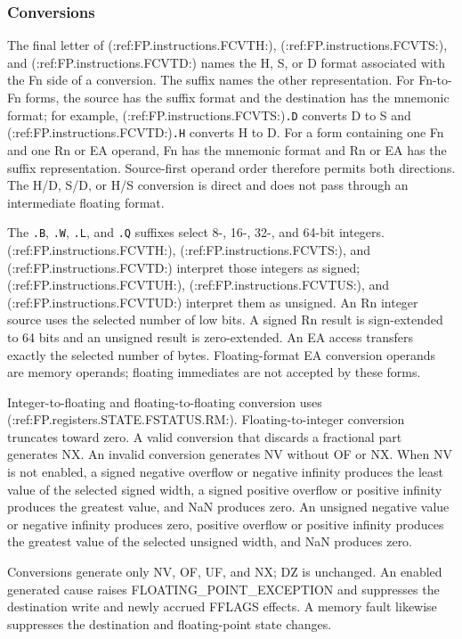 \subsubsection{Conversions}

The final letter of (:ref:FP.instructions.FCVTH:), (:ref:FP.instructions.FCVTS:), and
(:ref:FP.instructions.FCVTD:) names the H, S, or D format associated with
the Fn side of a conversion. The suffix names the other representation. For Fn-to-Fn forms, the source has the
suffix format and the destination has the mnemonic format; for example,
(:ref:FP.instructions.FCVTS:)\texttt{.D} converts D to S and
(:ref:FP.instructions.FCVTD:)\texttt{.H} converts H to D. For a form containing one Fn and one Rn or EA operand, Fn has the mnemonic
format and Rn or EA has the suffix representation. Source-first operand order therefore permits both directions.
The H/D, S/D, or H/S conversion is direct and does not pass through an intermediate floating format.

The \texttt{.B}, \texttt{.W}, \texttt{.L}, and \texttt{.Q} suffixes select 8-, 16-, 32-, and 64-bit integers.
(:ref:FP.instructions.FCVTH:), (:ref:FP.instructions.FCVTS:), and (:ref:FP.instructions.FCVTD:) interpret those
integers as signed; (:ref:FP.instructions.FCVTUH:), (:ref:FP.instructions.FCVTUS:), and
(:ref:FP.instructions.FCVTUD:) interpret them as unsigned. An Rn integer source uses the
selected number of low bits. A signed Rn result is sign-extended to 64 bits and an unsigned result is zero-extended.
An EA access transfers exactly the selected number of bytes. Floating-format EA conversion operands are memory
operands; floating immediates are not accepted by these forms.

Integer-to-floating and floating-to-floating conversion uses (:ref:FP.registers.STATE.FSTATUS.RM:). Floating-to-integer conversion
truncates toward zero. A valid conversion that discards a fractional part generates NX. An invalid conversion
generates NV without OF or NX. When NV is not enabled, a signed negative overflow or negative infinity produces
the least value of the selected signed width, a signed positive overflow or positive infinity produces the greatest
value, and NaN produces zero. An unsigned negative value or negative infinity produces zero, positive overflow or
positive infinity produces the greatest value of the selected unsigned width, and NaN produces zero.

Conversions generate only NV, OF, UF, and NX; DZ is unchanged. An enabled generated cause raises
FLOATING\_POINT\_EXCEPTION and suppresses the destination write and newly accrued FFLAGS effects. A memory fault
likewise suppresses the destination and floating-point state changes.
